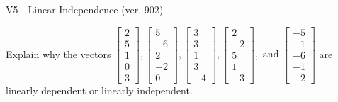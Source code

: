 \begin{exercise}
  \begin{exerciseTitle}V5 - Linear Independence (ver. 902)\end{exerciseTitle}
  \begin{exerciseStatement}
    Explain why the vectors \(\left[\begin{array}{r}
2 \\
5 \\
1 \\
0 \\
3
\end{array}\right] , \left[\begin{array}{r}
5 \\
-6 \\
2 \\
-2 \\
0
\end{array}\right] , \left[\begin{array}{r}
3 \\
3 \\
1 \\
3 \\
-4
\end{array}\right] , \left[\begin{array}{r}
2 \\
-2 \\
5 \\
1 \\
-3
\end{array}\right] , \text{ and } \left[\begin{array}{r}
-5 \\
-1 \\
-6 \\
-1 \\
-2
\end{array}\right]\) are linearly dependent or linearly independent.	



\end{exerciseStatement}
\end{exercise}
